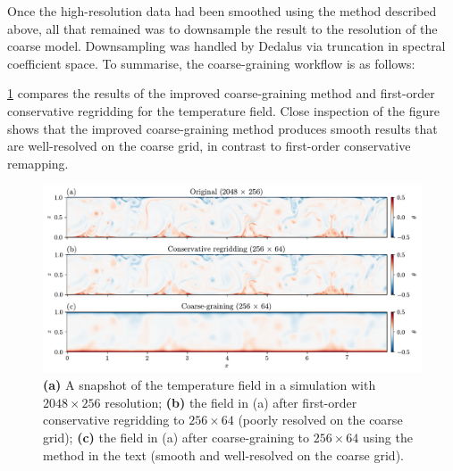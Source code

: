 \documentclass[../main.tex]{subfiles}
\begin{document}
Once the high-resolution data had been smoothed using the method described
above, all that remained was to downsample the result to the resolution of the
coarse model. Downsampling was handled by Dedalus via truncation in spectral
coefficient space. To summarise, the coarse-graining workflow is as follows:

\cref{fig:coarse_graining_example} compares the results of the improved
coarse-graining method and first-order conservative regridding for the
temperature field. Close inspection of the figure shows that the improved
coarse-graining method produces smooth results that are well-resolved on the
coarse grid, in contrast to first-order conservative remapping.

\begin{figure}[ht]
    \centering
    \includegraphics[width=\linewidth]{figures/coarse_graining_example.pdf}
    \caption{
        \textbf{(a)} A snapshot of the temperature field in a simulation with
        $2048 \times 256$ resolution; \textbf{(b)} the field in (a) after
        first-order conservative regridding to $256 \times 64$ (poorly
        resolved on the coarse grid); \textbf{(c)} the field in (a) after
        coarse-graining to $256 \times 64$ using the method in the text
        (smooth and well-resolved on the coarse grid).
    }
    \label{fig:coarse_graining_example}
\end{figure}
\end{document}

